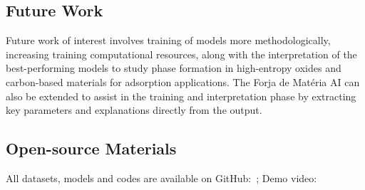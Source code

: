 \subsection*{Future Work}
Future work of interest involves training of models more methodologically, increasing training computational resources, along with the interpretation of the best-performing models to study phase formation in high-entropy oxides and carbon-based materials for adsorption applications. The Forja de Mat\'{e}ria AI can also be extended to assist in the training and interpretation phase by extracting key parameters and explanations directly from the output. 

\subsection*{Open-source Materials}
All datasets, models and codes are available on GitHub: \,; Demo video: 






